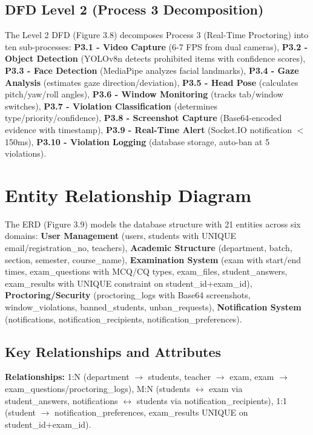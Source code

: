 \subsection{DFD Level 2 (Process 3 Decomposition)}

The Level 2 DFD (Figure 3.8) decomposes Process 3 (Real-Time Proctoring) into ten sub-processes: \textbf{P3.1 - Video Capture} (6-7 FPS from dual cameras), \textbf{P3.2 - Object Detection} (YOLOv8n detects prohibited items with confidence scores), \textbf{P3.3 - Face Detection} (MediaPipe analyzes facial landmarks), \textbf{P3.4 - Gaze Analysis} (estimates gaze direction/deviation), \textbf{P3.5 - Head Pose} (calculates pitch/yaw/roll angles), \textbf{P3.6 - Window Monitoring} (tracks tab/window switches), \textbf{P3.7 - Violation Classification} (determines type/priority/confidence), \textbf{P3.8 - Screenshot Capture} (Base64-encoded evidence with timestamp), \textbf{P3.9 - Real-Time Alert} (Socket.IO notification $<$150ms), \textbf{P3.10 - Violation Logging} (database storage, auto-ban at 5 violations).

\section{Entity Relationship Diagram}

The ERD (Figure 3.9) models the database structure with 21 entities across six domains: \textbf{User Management} (users, students with UNIQUE email/registration\_no, teachers), \textbf{Academic Structure} (department, batch, section, semester, course\_name), \textbf{Examination System} (exam with start/end times, exam\_questions with MCQ/CQ types, exam\_files, student\_answers, exam\_results with UNIQUE constraint on student\_id+exam\_id), \textbf{Proctoring/Security} (proctoring\_logs with Base64 screenshots, window\_violations, banned\_students, unban\_requests), \textbf{Notification System} (notifications, notification\_recipients, notification\_preferences).

\subsection{Key Relationships and Attributes}

\textbf{Relationships:} 1:N (department $\rightarrow$ students, teacher $\rightarrow$ exam, exam $\rightarrow$ exam\_questions/proctoring\_logs), M:N (students $\leftrightarrow$ exam via student\_answers, notifications $\leftrightarrow$ students via notification\_recipients), 1:1 (student $\rightarrow$ notification\_preferences, exam\_results UNIQUE on student\_id+exam\_id).

